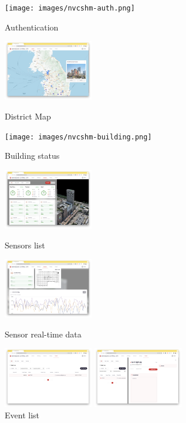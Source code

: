 \begin{figure}[!ht]
	\begin{fullwidth}
		\parbox{0.35\textwidth}{
			\centering
			\texttt{[image: images/nvcshm-auth.png]}
			\caption*{Authentication}
		}\qquad
		\parbox{0.35\textwidth}{
			\centering
			\includegraphics[width=0.35\textwidth]{images/nvcshm-map.png}
			\caption*{District Map}
		}\qquad
		\parbox{0.35\textwidth}{
			\centering
			\texttt{[image: images/nvcshm-building.png]}
			\caption*{Building status}
		}\qquad
		\parbox{0.35\textwidth}{
			\centering
			\includegraphics[width=0.35\textwidth]{images/nvcshm-sensors.png}
			\caption*{Sensors list}
		}
		\parbox{0.35\textwidth}{
			\centering
			\includegraphics[width=0.35\textwidth]{images/nvcshm-sensor-realtime.png}
			\caption*{Sensor real-time data}
		}\qquad
		\parbox{0.35\textwidth}{
			\centering
			\includegraphics[width=0.35\textwidth]{images/nvcshm-events.png}
			\caption*{Event list}
		}\qquad
		\parbox{0.35\textwidth}{
			\centering
			\includegraphics[width=0.35\textwidth]{images/nvcshm-event-detail.png}
}
\end{fullwidth}
\end{figure}
